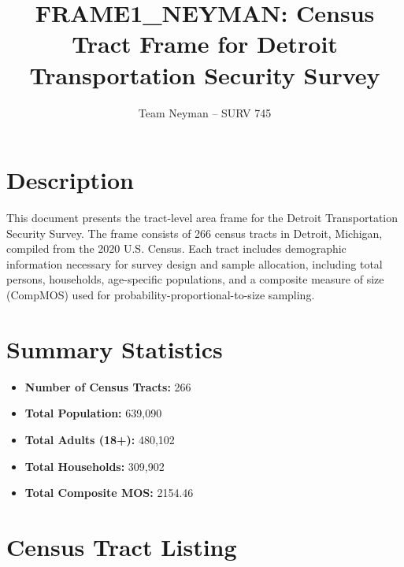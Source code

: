 \documentclass[11pt,landscape]{article}
\title{FRAME1\_NEYMAN: Census Tract Frame for Detroit Transportation Security Survey}
\author{Team Neyman -- SURV 745}
\date{}
\begin{document}
\maketitle

\section*{Description}

This document presents the tract-level area frame for the Detroit Transportation Security Survey. The frame consists of 266 census tracts in Detroit, Michigan, compiled from the 2020 U.S. Census. Each tract includes demographic information necessary for survey design and sample allocation, including total persons, households, age-specific populations, and a composite measure of size (CompMOS) used for probability-proportional-to-size sampling.

\section*{Summary Statistics}

\begin{itemize}
\item \textbf{Number of Census Tracts:} 266
\item \textbf{Total Population:} 639,090
\item \textbf{Total Adults (18+):} 480,102
\item \textbf{Total Households:} 309,902
\item \textbf{Total Composite MOS:} 2154.46\
\end{itemize}

\newpage

\section*{Census Tract Listing}
\end{document}
